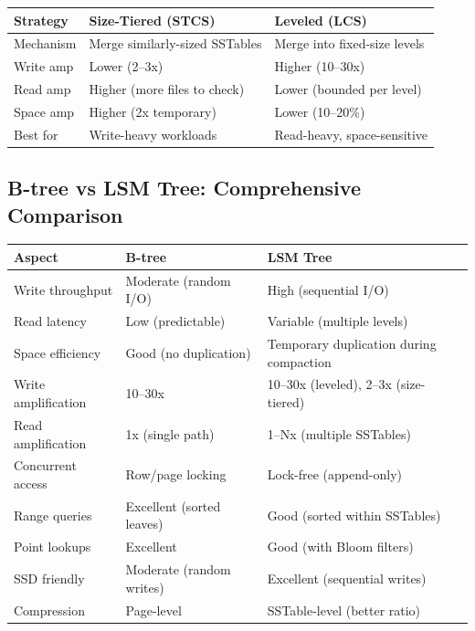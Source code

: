 \documentclass[12pt,a4paper]{article}
\begin{document}
\begin{center}
\begin{tabular}{lp{5cm}p{5cm}}
\toprule
\textbf{Strategy} & \textbf{Size-Tiered (STCS)} & \textbf{Leveled (LCS)} \\
\midrule
Mechanism & Merge similarly-sized SSTables & Merge into fixed-size levels \\
Write amp & Lower (2--3x) & Higher (10--30x) \\
Read amp & Higher (more files to check) & Lower (bounded per level) \\
Space amp & Higher (2x temporary) & Lower (10--20\%) \\
Best for & Write-heavy workloads & Read-heavy, space-sensitive \\
\bottomrule
\end{tabular}
\end{center}

\subsection{B-tree vs LSM Tree: Comprehensive Comparison}

\begin{center}
\begin{tabular}{lp{5cm}p{5cm}}
\toprule
\textbf{Aspect} & \textbf{B-tree} & \textbf{LSM Tree} \\
\midrule
Write throughput & Moderate (random I/O) & High (sequential I/O) \\
Read latency & Low (predictable) & Variable (multiple levels) \\
Space efficiency & Good (no duplication) & Temporary duplication during compaction \\
Write amplification & 10--30x & 10--30x (leveled), 2--3x (size-tiered) \\
Read amplification & 1x (single path) & 1--Nx (multiple SSTables) \\
Concurrent access & Row/page locking & Lock-free (append-only) \\
Range queries & Excellent (sorted leaves) & Good (sorted within SSTables) \\
Point lookups & Excellent & Good (with Bloom filters) \\
SSD friendly & Moderate (random writes) & Excellent (sequential writes) \\
Compression & Page-level & SSTable-level (better ratio) \\
\bottomrule
\end{tabular}
\end{center}
\end{document}
